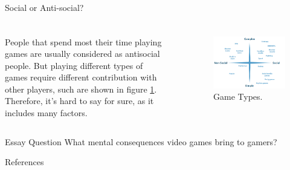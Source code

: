\documentclass{beamer}
\begin{document}
\begin{frame}{Social or Anti-social?}
	\frametitle{}
	\begin{columns}
		People that spend most their time playing games are usually considered as antisocial people. But playing different types of games require different contribution with other players, such are shown in figure \ref{fig:gtypes}. Therefore, it's hard to say for sure, as it includes many factors.
		\frametitle{}
		\begin{figure}
			\includegraphics[width=\linewidth]{all-video-game-genres-2}
			\caption{Game Types.}
			\label{fig:gtypes}
		\end{figure}
	\end{columns}
\end{frame}

\begin{frame}{Essay Question}
	What mental consequences video games bring to gamers?
\end{frame}

\begin{frame}{References}
	
	
\end{frame}
\end{document}

